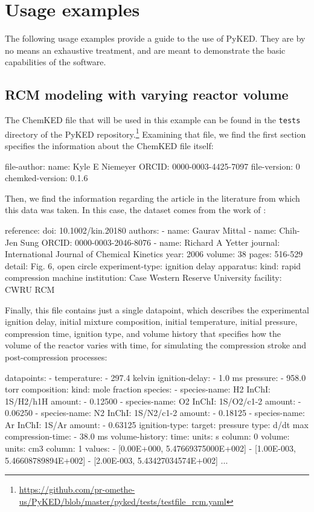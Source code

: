 \documentclass[12pt]{ijck}
\newcommand\ck{ChemKED}
\newcommand\pk{PyKED}
\begin{document}
\section{Usage examples}
\label{sec:usage-example}

The following usage examples provide a guide to the use of \pk{}. They are by no
means an exhaustive treatment, and are meant to demonstrate the basic
capabilities of the software.

\subsection{RCM modeling with varying reactor volume}
\label{sec:rcm-modeling}

The \ck{} file that will be used in this example can be found in the
\texttt{tests} directory of the PyKED
repository.\footnote{\url{https://github.com/pr-omethe-us/PyKED/blob/master/pyked/tests/testfile_rcm.yaml}}
Examining that file, we find the first section specifies the information about
the \ck{} file itself:
%
\begin{yamlbox}
file-author:
  name: Kyle E Niemeyer
  ORCID: 0000-0003-4425-7097
file-version: 0
chemked-version: 0.1.6
\end{yamlbox}
%
Then, we find the information regarding the article in the literature from which
this data was taken. In this case, the dataset comes from the work of
\textcite{Mittal2006a}:
\begin{yamlbox}
reference:
  doi: 10.1002/kin.20180
  authors:
    - name: Gaurav Mittal
    - name: Chih-Jen Sung
      ORCID: 0000-0003-2046-8076
    - name: Richard A Yetter
  journal: International Journal of Chemical Kinetics
  year: 2006
  volume: 38
  pages: 516-529
  detail: Fig. 6, open circle
experiment-type: ignition delay
apparatus:
  kind: rapid compression machine
  institution: Case Western Reserve University
  facility: CWRU RCM
\end{yamlbox}
%
Finally, this file contains just a single datapoint, which describes the experimental
ignition delay, initial mixture composition, initial temperature, initial pressure,
compression time, ignition type, and volume history that specifies
how the volume of the reactor varies with time, for simulating the compression
stroke and post-compression processes:
%
\begin{yamlbox}
datapoints:
- temperature:
    - 297.4 kelvin
  ignition-delay:
    - 1.0 ms
  pressure:
    - 958.0 torr
  composition:
    kind: mole fraction
    species:
      - species-name: H2
        InChI: 1S/H2/h1H
        amount:
          - 0.12500
      - species-name: O2
        InChI: 1S/O2/c1-2
        amount:
          - 0.06250
      - species-name: N2
        InChI: 1S/N2/c1-2
        amount:
          - 0.18125
      - species-name: Ar
        InChI: 1S/Ar
        amount:
          - 0.63125
  ignition-type:
    target: pressure
    type: d/dt max
  compression-time:
    - 38.0 ms
  volume-history:
    time:
      units: s
      column: 0
    volume:
      units: cm3
      column: 1
    values:
      - [0.00E+000, 5.47669375000E+002]
      - [1.00E-003, 5.46608789894E+002]
      - [2.00E-003, 5.43427034574E+002]
      ...
\end{yamlbox}
\end{document}
